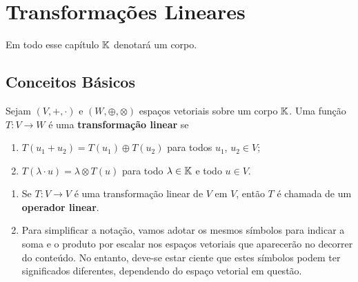 
\chapter{Transformações Lineares}

Em todo esse capítulo $\mathbb{K}$ denotará um corpo.

\section{Conceitos Básicos}

\begin{definicao}
  Sejam $(V, +, \cdot)$ e $(W, \oplus, \otimes)$ espaços vetoriais sobre um corpo $\mathbb{K}$. Uma função $T \colon V \to W$ é uma \textbf{transformação linear} se
  \begin{enumerate}[label={\roman*})]
    \item $T(u_1 + u_2) = T(u_1) \oplus T(u_2)$ para todos $u_1$, $u_2 \in V$;
    \item $T(\lambda \cdot u) = \lambda \otimes T(u)$ para todo $\lambda \in \mathbb{K}$ e todo $u \in V$.
  \end{enumerate}
\end{definicao}

\begin{observacoes}
    \begin{enumerate}[label={\roman*})]
        \item Se $T \colon V \to V$ é uma transformação linear de $V$ em $V$, então $T$ é chamada de um \textbf{operador linear}.

        \item Para simplificar a notação, vamos adotar os mesmos símbolos para indicar a soma e o produto por escalar nos espaços vetoriais que aparecerão no decorrer do conteúdo. No entanto, deve-se estar ciente que estes símbolos podem ter significados diferentes, dependendo do espaço vetorial em questão.
    \end{enumerate}
\end{observacoes}

